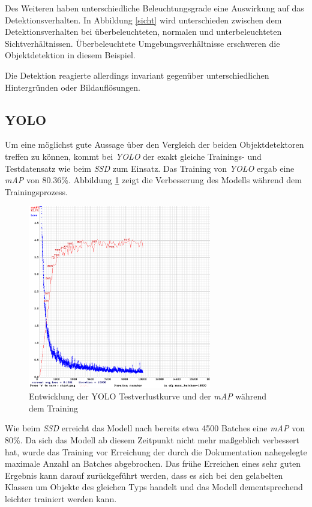 Des Weiteren haben unterschiedliche Beleuchtungsgrade eine Auswirkung auf das Detektionsverhalten. In Abbildung \ref{sicht} wird unterschieden zwischen dem Detektionsverhalten bei überbeleuchteten, normalen und unterbeleuchteten Sichtverhältnissen. Überbeleuchtete Umgebungsverhältnisse erschweren die Objektdetektion in diesem Beispiel. 

Die Detektion reagierte allerdings invariant gegenüber unterschiedlichen Hintergründen oder Bildauflösungen.

\subsection*{YOLO}

Um eine möglichst gute Aussage über den Vergleich der beiden Objektdetektoren treffen zu können, kommt bei \textit{YOLO} der exakt gleiche Trainings- und Testdatensatz wie beim \textit{SSD} zum Einsatz. Das Training von \textit{YOLO} ergab eine \textit{mAP} von 80.36\%. Abbildung \ref{yolo_result} zeigt die Verbesserung des Modells während dem Trainingsprozess. 

\begin{figure}[H]
	\begin{center}
		\includegraphics[width=8cm]{Bilder/yolo_result.png} 
		\caption{Entwicklung der YOLO Testverlustkurve und der \textit{mAP} während dem Training}
		\label{yolo_result}
	\end{center}
\end{figure}

Wie beim \textit{SSD} erreicht das Modell nach bereits etwa 4500 Batches eine \textit{mAP} von 80\%. Da sich das Modell ab diesem Zeitpunkt nicht mehr maßgeblich verbessert hat, wurde das Training vor Erreichung der durch die Dokumentation nahegelegte maximale Anzahl an Batches abgebrochen. Das frühe Erreichen eines sehr guten Ergebnis kann darauf zurückgeführt werden, dass es sich bei den gelabelten Klassen um Objekte des gleichen Typs handelt und das Modell dementsprechend leichter trainiert werden kann. 

